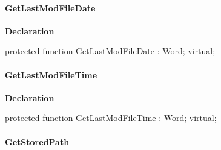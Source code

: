 \documentclass{report}
\newif\ifpdf
\begin{document}
\paragraph*{GetLastModFileDate}\hspace*{\fill}

\label{AbArcTyp.TAbArchiveItem-GetLastModFileDate}
\begin{list}{}{
\setlength{\itemindent}{0cm}
\setlength{\listparindent}{0cm}
\setlength{\leftmargin}{\evensidemargin}
\addtolength{\leftmargin}{\tmplength}
\settowidth{\labelsep}{X}
\addtolength{\leftmargin}{\labelsep}
\setlength{\labelwidth}{\tmplength}
}
\item[\textbf{Declaration}\hfill]
\ifpdf
\begin{flushleft}
\fi
\begin{ttfamily}
protected function GetLastModFileDate : Word; virtual;\end{ttfamily}

\ifpdf
\end{flushleft}
\fi

\end{list}
\paragraph*{GetLastModFileTime}\hspace*{\fill}

\label{AbArcTyp.TAbArchiveItem-GetLastModFileTime}
\begin{list}{}{
\setlength{\itemindent}{0cm}
\setlength{\listparindent}{0cm}
\setlength{\leftmargin}{\evensidemargin}
\addtolength{\leftmargin}{\tmplength}
\settowidth{\labelsep}{X}
\addtolength{\leftmargin}{\labelsep}
\setlength{\labelwidth}{\tmplength}
}
\item[\textbf{Declaration}\hfill]
\ifpdf
\begin{flushleft}
\fi
\begin{ttfamily}
protected function GetLastModFileTime : Word; virtual;\end{ttfamily}

\ifpdf
\end{flushleft}
\fi

\end{list}
\paragraph*{GetStoredPath}\hspace*{\fill}
\end{document}

